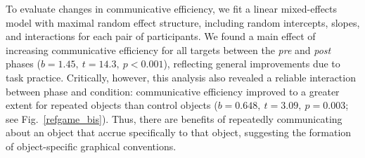 \documentclass[10pt,letterpaper]{article}
\newcommand{\ndg}[1]{{\textcolor{Green}{[ndg: #1]}}}
\begin{document}

To evaluate changes in communicative efficiency, we fit a linear mixed-effects model with maximal random effect structure, including random intercepts, slopes, and interactions for each pair of participants.
We found a main effect of increasing communicative efficiency for all targets between the \textit{pre} and \textit{post} phases ($b = 1.45,~t = 14.3,~p <0.001$), reflecting general improvements due to task practice.
Critically, however, this analysis also revealed a reliable interaction between phase and condition: communicative efficiency improved to a greater extent for repeated objects than control objects ($b = 0.648, ~t = 3.09,~p = 0.003$; see Fig.~\ref{refgame_bis}).
Thus, there are benefits of repeatedly communicating about an object that accrue specifically to that object, suggesting the formation of object-specific graphical conventions.





\end{document}
